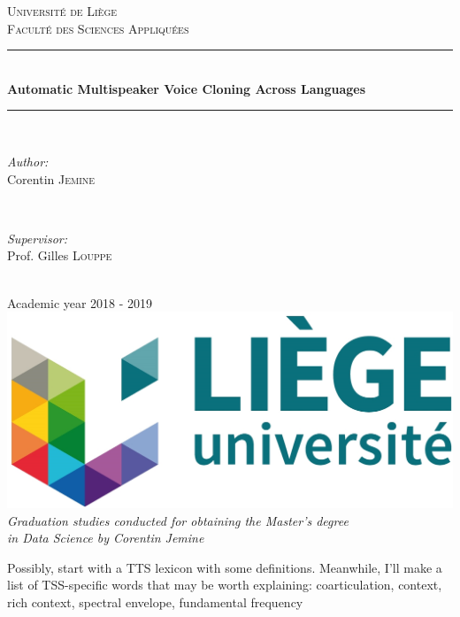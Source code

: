 \documentclass[a4paper, oneside]{article}
\begin{document}
\begin{titlepage}
	\newcommand{\HRule}{\rule{\linewidth}{0.5mm}}
	\center
	\textsc{\LARGE Université de Liège}\\[1cm]
	\textsc{\Large Faculté des Sciences Appliquées}\\[2cm]
		
	\HRule \\[0.5cm]
	{ \huge \bfseries Automatic Multispeaker Voice Cloning Across Languages}\\[0.2cm]
	\HRule \\[3cm]

	\begin{minipage}{0.4\textwidth}
		\begin{flushleft} \Large
			\emph{Author:}\\
			Corentin \textsc{Jemine}
		\end{flushleft}
	\end{minipage}
	~
	\begin{minipage}{0.4\textwidth}
		\begin{flushright} \Large
			\emph{Supervisor:} \\
			Prof. Gilles \textsc{Louppe}
		\end{flushright}
	\end{minipage}\\[4cm]
	
	{\LARGE Academic year 2018 - 2019}\\[2cm]
	
	\includegraphics{images/uliege_logo.jpg}\\[1.25cm]
	
	\textit{Graduation studies conducted for obtaining the Master's degree \\in Data Science by Corentin Jemine}
	
	\vfill
\end{titlepage}

\setcounter{page}{2}

\color{red}
Possibly, start with a TTS lexicon with some definitions. Meanwhile, I'll make a list of TSS-specific words that may be worth explaining: coarticulation, context, rich context, spectral envelope, fundamental frequency
\color{black}
\end{document}
